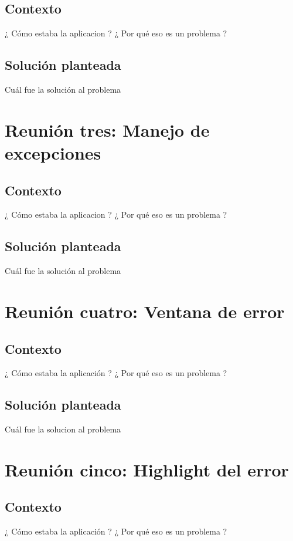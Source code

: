 \documentclass[a4paper,oneside,10pt]{article}
\begin{document}
\subsection{Contexto}
¿ C\'omo estaba la aplicacion ? ¿ Por qu\'e eso es un problema ?

\subsection{Soluci\'on planteada}
Cu\'al fue la soluci\'on al problema

\section{Reuni\'on tres: Manejo de excepciones}

\subsection{Contexto}
¿ C\'omo estaba la aplicacion ? ¿ Por qu\'e eso es un problema ?

\subsection{Soluci\'on planteada}
Cu\'al fue la soluci\'on al problema

\section{Reuni\'on cuatro: Ventana de error}

\subsection{Contexto}
¿ C\'omo estaba la aplicaci\'on ? ¿ Por qu\'e eso es un problema ?

\subsection{Soluci\'on planteada}
Cu\'al fue la solucion al problema

\section{Reuni\'on cinco: Highlight del error}

\subsection{Contexto}
¿ C\'omo estaba la aplicaci\'on ? ¿ Por qu\'e eso es un problema ?
\end{document}
